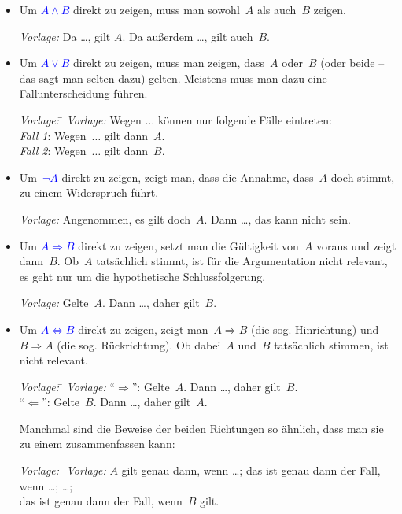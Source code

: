 \documentclass[12pt,a4paper,ngerman]{scrartcl}
\theoremstyle{definition}
\theoremstyle{plain}
\theoremstyle{remark}
\newcommand{\hil}[1]{\textcolor{blue}{#1}}
\begin{document}
\begin{itemize}
\item Um \hil{$A \wedge B$} direkt zu zeigen, muss man sowohl~$A$ als auch~$B$ zeigen.

\emph{Vorlage:} Da \ldots, gilt $A$. Da außerdem \ldots, gilt auch~$B$.

\item Um \hil{$A \vee B$} direkt zu zeigen, muss man zeigen, dass~$A$ oder~$B$ (oder beide
-- das sagt man selten dazu) gelten. Meistens muss man dazu eine
Fallunterscheidung führen.

\begin{tabbing}
  \emph{Vorlage:} \= \kill
  \emph{Vorlage:} \> Wegen $\ldots$ können nur folgende Fälle eintreten: \\
  \> \emph{Fall 1}: Wegen~$\ldots$ gilt dann~$A$. \\
  \> \emph{Fall 2}: Wegen~$\ldots$ gilt dann~$B$.
\end{tabbing}

\item Um~\hil{$\neg A$} direkt zu zeigen, zeigt man, dass die Annahme, dass~$A$ doch stimmt,
zu einem Widerspruch führt.

\emph{Vorlage:} Angenommen, es gilt doch~$A$. Dann \ldots, das kann nicht sein.

\item Um \hil{$A \Rightarrow B$} direkt zu zeigen, setzt man die Gültigkeit von~$A$ voraus
und zeigt dann~$B$. Ob~$A$ tatsächlich stimmt, ist für die Argumentation nicht
relevant, es geht nur um die hypothetische Schlussfolgerung.

\emph{Vorlage:} Gelte~$A$. Dann \ldots, daher gilt~$B$.

\item Um \hil{$A \Leftrightarrow B$} direkt zu zeigen, zeigt man~$A \Rightarrow B$
(die sog. Hinrichtung) und~$B \Rightarrow A$ (die sog. Rückrichtung). Ob
dabei~$A$ und~$B$ tatsächlich stimmen, ist nicht relevant.

\begin{tabbing}
  \emph{Vorlage:} \= \kill
  \emph{Vorlage:} \> "`$\Rightarrow$"': Gelte~$A$. Dann \ldots, daher gilt~$B$. \\
  \> "`$\Leftarrow$"': Gelte~$B$. Dann \ldots, daher gilt~$A$.
\end{tabbing}

Manchmal sind die Beweise der beiden Richtungen so ähnlich, dass man sie zu
einem zusammenfassen kann:

\begin{tabbing}
  \emph{Vorlage:} \= \kill
  \emph{Vorlage:} \> $A$ gilt genau dann, wenn \ldots; das ist genau dann der
Fall, wenn \ldots; \ldots; \\
  \> das ist genau dann der Fall, wenn~$B$ gilt.
\end{tabbing}


\end{itemize}
\end{document}
